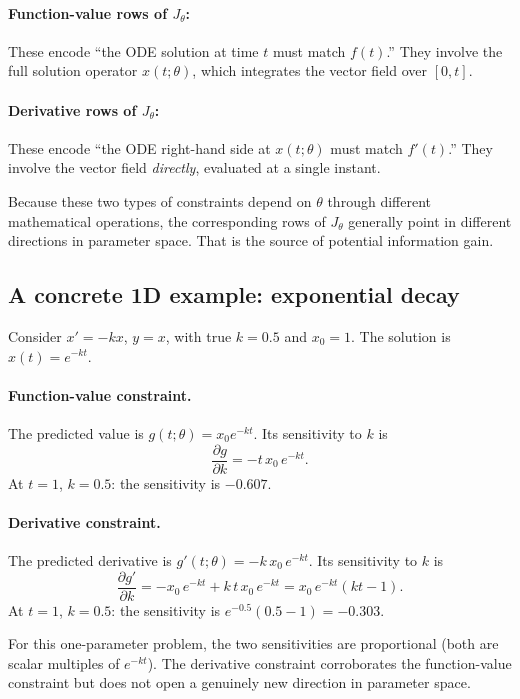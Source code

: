 \documentclass[11pt]{article}
\begin{document}
\paragraph{Function-value rows of $J_\theta$:}
These encode ``the ODE solution at time $t$ must match $f(t)$.'' They involve the full solution operator $x(t;\theta)$, which integrates the vector field over $[0,t]$.

\paragraph{Derivative rows of $J_\theta$:}
These encode ``the ODE right-hand side at $x(t;\theta)$ must match $f'(t)$.'' They involve the vector field \emph{directly}, evaluated at a single instant.

Because these two types of constraints depend on $\theta$ through different mathematical operations, the corresponding rows of $J_\theta$ generally point in different directions in parameter space. That is the source of potential information gain.

\subsection*{A concrete 1D example: exponential decay}
Consider $x'=-kx$, $y=x$, with true $k=0.5$ and $x_0=1$. The solution is $x(t)=e^{-kt}$.

\paragraph{Function-value constraint.}
The predicted value is $g(t;\theta)=x_0 e^{-kt}$. Its sensitivity to $k$ is
\[
\frac{\partial g}{\partial k} = -t\, x_0\, e^{-kt}.
\]
At $t=1$, $k=0.5$: the sensitivity is $-0.607$.

\paragraph{Derivative constraint.}
The predicted derivative is $g'(t;\theta)=-k\, x_0\, e^{-kt}$. Its sensitivity to $k$ is
\[
\frac{\partial g'}{\partial k}
= -x_0\, e^{-kt} + k\, t\, x_0\, e^{-kt}
= x_0\, e^{-kt}(kt-1).
\]
At $t=1$, $k=0.5$: the sensitivity is $e^{-0.5}(0.5-1) = -0.303$.

For this one-parameter problem, the two sensitivities are proportional (both are scalar multiples of $e^{-kt}$). The derivative constraint corroborates the function-value constraint but does not open a genuinely new direction in parameter space.
\end{document}
